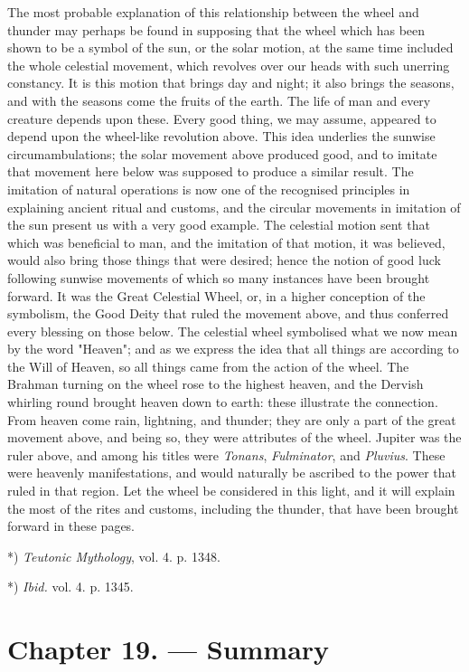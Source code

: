 \documentclass[a4paper, 11pt, oneside, polutonikogreek, english]{article}
\begin{document}
The most probable explanation of this relationship between the wheel and thunder may perhaps be found in supposing that the wheel which has been shown to be a symbol of the sun, or the solar motion, at the same time included the whole celestial movement, which revolves over our heads with such unerring constancy. It is this motion that brings day and night; it also brings the seasons, and with the seasons come the fruits of the earth. The life of man and every creature depends upon these. Every good thing, we may assume, appeared to depend upon the wheel-like revolution above. This idea underlies the sunwise circumambulations; the solar movement above produced good, and to imitate that movement here below was supposed to produce a similar result. The imitation of natural operations is now one of the recognised principles in explaining ancient ritual and customs, and the circular movements in imitation of the sun present us with a very good example. The celestial motion sent that which was beneficial to man, and the imitation of that motion, it was believed, would also bring those things that were desired; hence the notion of good luck following sunwise movements of which so many instances have been brought forward. It was the Great Celestial Wheel, or, in a higher conception of the symbolism, the Good Deity that ruled the movement above, and thus conferred every blessing on those below. The celestial wheel symbolised what we now mean by the word "Heaven"; and as we express the idea that all things are according to the Will of Heaven, so all things came from the action of the wheel. The Brahman turning on the wheel rose to the highest heaven, and the Dervish whirling round brought heaven down to earth: these illustrate the connection. From heaven come rain, lightning, and thunder; they are only a part of the great movement above, and being so, they were attributes of the wheel. Jupiter was the ruler above, and among his titles were \emph{Tonans}, \emph{Fulminator}, and \emph{Pluvius}. These were heavenly manifestations, and would naturally be ascribed to the power that ruled in that region. Let the wheel be considered in this light, and it will explain the most of the rites and customs, including the thunder, that have been brought forward in these pages.

*) \emph{Teutonic Mythology}, vol. 4. p. 1348.

*) \emph{Ibid.} vol. 4. p. 1345.
\clearpage
\section{Chapter 19. --- Summary}
\end{document}
